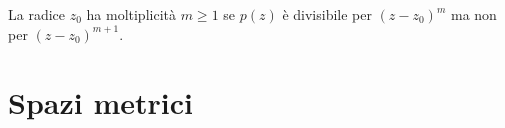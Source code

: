 \documentclass[a4paper]{article}
\begin{document}
La radice \(z_0\) ha moltiplicità \(m \geq 1\) se
\(p(z)\) è divisibile per \((z-z_0)^m\) ma non per \((z-z_0)^{m+1}\).


\pagebreak

\section{Spazi metrici}



\end{document}
